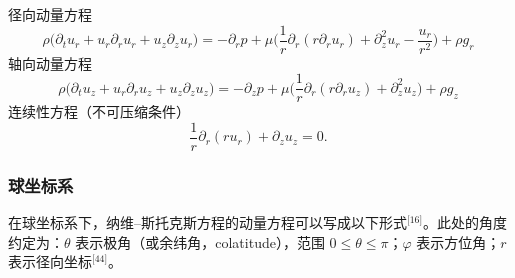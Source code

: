 径向动量方程
$$
\rho \big(
\partial_t u_r
+ u_r \partial_r u_r
+ u_z \partial_z u_r
\big)
=
-\partial_r p
+ \mu
\Big(
\frac{1}{r}\partial_r (r \partial_r u_r)
+ \partial_z^2 u_r
- \frac{u_r}{r^2}
\Big)
+ \rho g_r~
$$
轴向动量方程
$$
\rho \big(
\partial_t u_z
+ u_r \partial_r u_z
+ u_z \partial_z u_z
\big)
=
-\partial_z p
+ \mu
\Big(
\frac{1}{r}\partial_r (r \partial_r u_z)
+ \partial_z^2 u_z
\Big)
+ \rho g_z~
$$
连续性方程（不可压缩条件）
$$
\frac{1}{r} \partial_r (r u_r)
+ \partial_z u_z
= 0.~
$$
\subsubsection{球坐标系}
在球坐标系下，纳维–斯托克斯方程的动量方程可以写成以下形式\(^\text{[16]}\)。此处的角度约定为：$\theta$ 表示极角（或余纬角，colatitude），范围 $0 \leq \theta \leq \pi$；$\varphi$ 表示方位角；$r$ 表示径向坐标\(^\text{[44]}\)。

